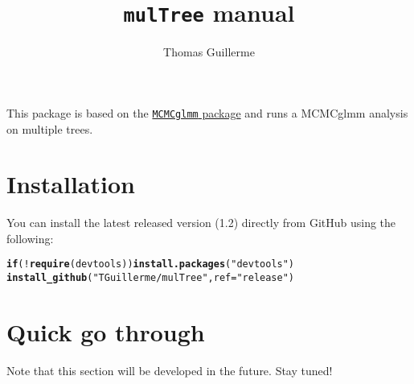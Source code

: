 \documentclass{article}\usepackage[]{graphicx}\usepackage[]{color}
\makeatletter
\newcommand{\hlstr}[1]{\textcolor[rgb]{0.192,0.494,0.8}{#1}}%
\newcommand{\hlopt}[1]{\textcolor[rgb]{0,0,0}{#1}}%
\newcommand{\hlstd}[1]{\textcolor[rgb]{0.345,0.345,0.345}{#1}}%
\newcommand{\hlkwa}[1]{\textcolor[rgb]{0.161,0.373,0.58}{\textbf{#1}}}%
\newcommand{\hlkwc}[1]{\textcolor[rgb]{0.333,0.667,0.333}{#1}}%
\newcommand{\hlkwd}[1]{\textcolor[rgb]{0.737,0.353,0.396}{\textbf{#1}}}%
\newenvironment{kframe}{%
 \def\at@end@of@kframe{}%
 \ifinner\ifhmode%
  \def\at@end@of@kframe{\end{minipage}}%
  \begin{minipage}{\columnwidth}%
 \fi\fi%
 \def\FrameCommand##1{\hskip\@totalleftmargin \hskip-\fboxsep
 \colorbox{shadecolor}{##1}\hskip-\fboxsep
     \hskip-\linewidth \hskip-\@totalleftmargin \hskip\columnwidth}%
 \MakeFramed {\advance\hsize-\width
   \@totalleftmargin\z@ \linewidth\hsize
   \@setminipage}}%
 {\par\unskip\endMakeFramed%
 \at@end@of@kframe}
\newenvironment{knitrout}{}{} %
\makeatother
\begin{document}
\title{\texttt{mulTree} manual}


\author{Thomas Guillerme}

\maketitle

This package is based on the \href{http://cran.r-project.org/web/packages/MCMCglmm/index.html}{\texttt{MCMCglmm} package} and runs a MCMCglmm analysis on multiple trees.

\section{Installation}
You can install the latest released version (1.2) directly from GitHub using the following:

\begin{knitrout}
\color{fgcolor}\begin{kframe}
\begin{alltt}
\hlkwa{if}\hlstd{(}\hlopt{!}\hlkwd{require}\hlstd{(devtools))} \hlkwd{install.packages}\hlstd{(}\hlstr{"devtools"}\hlstd{)}
\hlkwd{install_github}\hlstd{(}\hlstr{"TGuillerme/mulTree"}\hlstd{,} \hlkwc{ref} \hlstd{=} \hlstr{"release"}\hlstd{)}
\end{alltt}
\end{kframe}
\end{knitrout}


\section{Quick go through}

Note that this section will be developed in the future.
Stay tuned!
\end{document}
